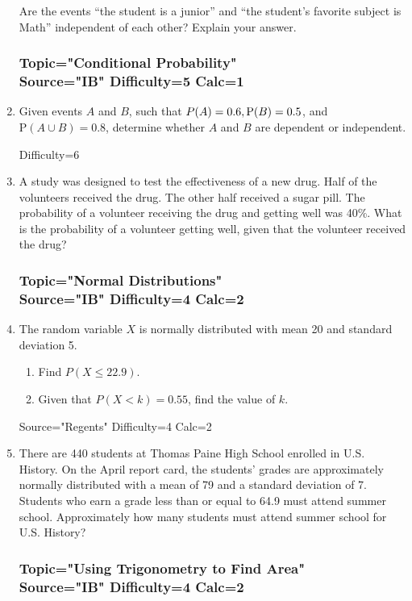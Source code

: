 \documentclass[12pt, oneside]{article}
\begin{document}
\begin{enumerate}
Are the events ``the student is a junior” and ``the student’s favorite subject is Math” independent of each other? Explain your answer. %

\subsubsection*{Topic="Conditional Probability"\\
Source="IB" 
Difficulty=5 
Calc=1}

\item Given events $A$ and $B$, such that $\mathrm \mathrm P(A)=0.6, \mathrm P(B)=0.5$, and $\mathrm P(A \cup B) =0.8$, determine whether $A$ and $B$ are dependent or independent. 

Difficulty=6 
\item A study was designed to test the effectiveness of a new drug. Half of the volunteers received the drug. The other half received a sugar pill. The probability of a volunteer receiving the drug and getting well was 40\%. What is the probability of a volunteer getting well, given that the volunteer received the drug? %

\subsubsection*{Topic="Normal Distributions"\\
Source="IB" 
Difficulty=4 
Calc=2}

\item The random variable $X$ is normally distributed with mean 20 and standard deviation 5. 
\begin{enumerate}
    \item Find $P(X \leq 22.9)$.
    \item Given that $P(X < k) = 0.55$, find the value of $k$.
\end{enumerate}

Source="Regents" 
Difficulty=4 
Calc=2

\item There are 440 students at Thomas Paine High School enrolled in U.S. History. On the April report card, the students’ grades are approximately normally distributed with a mean of 79 and a standard deviation of 7. Students who earn a grade less than or equal to 64.9 must attend summer school. Approximately how many students must attend summer school for U.S. History?

\subsubsection*{Topic="Using Trigonometry to Find Area"\\
Source="IB" 
Difficulty=4 
Calc=2}


\end{enumerate}
\end{document}
